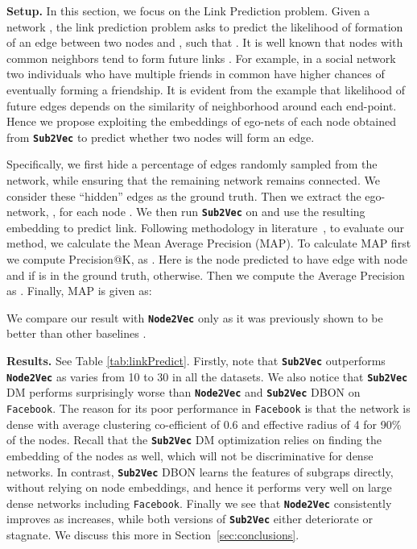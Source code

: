 \documentclass[sigconf]{acmart}
\newcommand{\alg}{{\bf {\tt Sub2Vec}}\xspace}
\newcommand{\nodevec}{{\bf {\tt Node2Vec}}\xspace}
\newcommand{\facebook}{{\tt Facebook}\xspace}
\begin{document}
\par \noindent 
\textbf{Setup.}
In this section, we focus on the Link Prediction problem. Given a network , the link prediction problem asks to predict the likelihood of formation of an edge between two nodes  and , such that . It is well known that nodes with common neighbors tend to form future links \cite{liben2007link}. For example, in a social network two individuals who have multiple friends in common have higher chances of eventually forming a friendship.  
It is evident from the example that likelihood of future edges depends on the similarity of neighborhood around each end-point. Hence we propose exploiting the embeddings of ego-nets of each node obtained from \alg to predict whether two nodes will form an edge.
 
Specifically, we first hide a  percentage of edges randomly sampled from the network, while ensuring that the remaining network remains connected. We consider these ``hidden'' edges as the ground truth. Then we extract the ego-network, , for each node . We then run \alg on  and use the resulting embedding to predict link. Following methodology in literature~\cite{wang2016structural}, to evaluate our method, we calculate the Mean Average Precision (MAP). To calculate MAP first we compute Precision@K, as  . Here  is the  node predicted to have edge with node  and   if  is in the ground truth,  otherwise. Then we compute the Average Precision as  .  Finally, MAP is given as:


We compare our result with \nodevec only as it was previously shown to be better than other baselines \cite{grover2016node2vec}.

\par \noindent 
\textbf{Results.} See  Table \ref{tab:linkPredict}. Firstly, note that \alg outperforms \nodevec as  varies from 10 to 30 in all the datasets.  We also notice that  \alg DM performs surprisingly worse than \nodevec and \alg DBON on \facebook. The reason for its poor performance in \facebook is that the network is dense with average clustering co-efficient of 0.6 and effective radius of 4 for 90\% of the nodes. Recall that the \alg DM optimization relies on finding the embedding of the nodes as well, which will not be discriminative for dense networks. In contrast, \alg DBON learns the features of subgraps directly, without relying on node embeddings, and hence it performs very well on large dense networks including \facebook. Finally we see that \nodevec consistently improves as  increases, while both versions of \alg either deteriorate or stagnate. We discuss this more in Section~\ref{sec:conclusions}.
\end{document}
